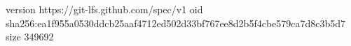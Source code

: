 version https://git-lfs.github.com/spec/v1
oid sha256:ea1f955a0530ddcb25aaf4712ed502d33bf767ee8d2b5f4cbe579ca7d8c3b5d7
size 349692
